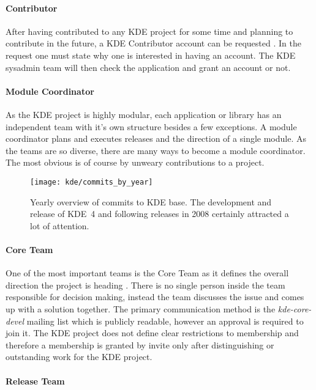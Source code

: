 \paragraph{Contributor}

After having contributed to any KDE project for some time and planning to
contribute in the future, a KDE Contributor account can be requested
\cite{KDEContribute,KDEContributor}. In the request one must state why one is
interested in having an account. The KDE sysadmin team will then check the
application and grant an account or not.

\paragraph{Module Coordinator}

As the KDE project is highly modular, each application or library has an
independent team with it's own structure besides a few exceptions. A module
coordinator plans and executes releases and the direction of a single module.
As the teams are so diverse, there are many ways to become a module
coordinator. The most obvious is of course by unweary contributions to a
project.

\begin{figure}[htbp]
  \centering
  \texttt{[image: kde/commits\_by\_year]}
  \caption{Yearly overview of commits to KDE base. The development and release of KDE~4 and
  following releases in 2008 certainly attracted a lot of attention.}
\end{figure}

\paragraph{Core Team}

One of the most important teams is the Core Team as it defines the overall
direction the project is heading \cite{KDEProjectManagement}. There is no
single person inside the team responsible for decision making, instead the team
discusses the issue and comes up with a solution together. The primary
communication method is the \emph{kde-core-devel} mailing list which is
publicly readable, however an approval is required to join it. The KDE project
does not define clear restrictions to membership and therefore a membership is
granted by invite only after distinguishing or outstanding work for the KDE
project.

\paragraph{Release Team}

